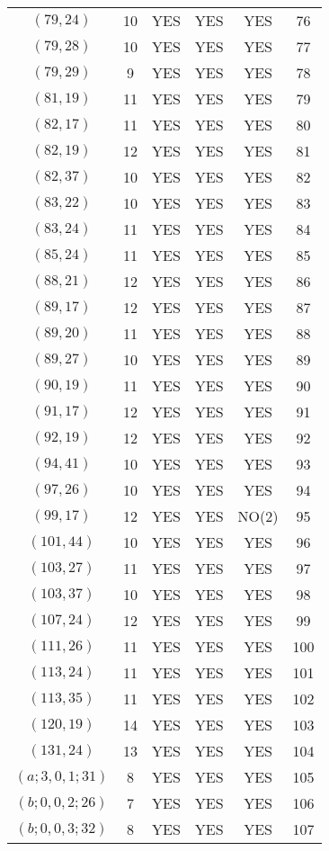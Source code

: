 \begin{longtable}{|c|c|c|c|c|c|}
$(79, 24)$ & 10 & YES & YES & YES & 76\\
$(79, 28)$ & 10 & YES & YES & YES & 77\\
$(79, 29)$ & 9 & YES & YES & YES & 78\\
$(81, 19)$ & 11 & YES & YES & YES & 79\\
$(82, 17)$ & 11 & YES & YES & YES & 80\\
$(82, 19)$ & 12 & YES & YES & YES & 81\\
$(82, 37)$ & 10 & YES & YES & YES & 82\\
$(83, 22)$ & 10 & YES & YES & YES & 83\\
$(83, 24)$ & 11 & YES & YES & YES & 84\\
$(85, 24)$ & 11 & YES & YES & YES & 85\\
$(88, 21)$ & 12 & YES & YES & YES & 86\\
$(89, 17)$ & 12 & YES & YES & YES & 87\\
$(89, 20)$ & 11 & YES & YES & YES & 88\\
$(89, 27)$ & 10 & YES & YES & YES & 89\\
$(90, 19)$ & 11 & YES & YES & YES & 90\\
$(91, 17)$ & 12 & YES & YES & YES & 91\\
$(92, 19)$ & 12 & YES & YES & YES & 92\\
$(94, 41)$ & 10 & YES & YES & YES & 93\\
$(97, 26)$ & 10 & YES & YES & YES & 94\\
$(99, 17)$ & 12 & YES & YES & NO(2) & 95\\
$(101, 44)$ & 10 & YES & YES & YES & 96\\
$(103, 27)$ & 11 & YES & YES & YES & 97\\
$(103, 37)$ & 10 & YES & YES & YES & 98\\
$(107, 24)$ & 12 & YES & YES & YES & 99\\
$(111, 26)$ & 11 & YES & YES & YES & 100\\
$(113, 24)$ & 11 & YES & YES & YES & 101\\
$(113, 35)$ & 11 & YES & YES & YES & 102\\
$(120, 19)$ & 14 & YES & YES & YES & 103\\
$(131, 24)$ & 13 & YES & YES & YES & 104\\
$(a; 3, 0, 1; 31)$ & 8 & YES & YES & YES & 105\\
$(b; 0, 0, 2; 26)$ & 7 & YES & YES & YES & 106\\
$(b; 0, 0, 3; 32)$ & 8 & YES & YES & YES & 107\\

\end{longtable}
